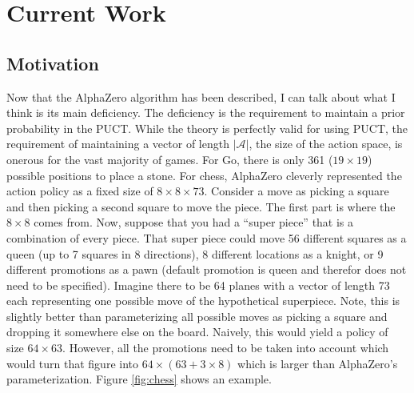 \documentclass{article}
\begin{document}
  \clearpage

  \section{Current Work}

  \subsection{Motivation}

  Now that the AlphaZero algorithm has been described, I can talk about what I think is its main deficiency. The deficiency is the requirement to maintain a prior probability in the PUCT. While the theory is perfectly valid for using PUCT, the requirement of maintaining a vector of length $\lvert \mathcal{A} \rvert$, the size of the action space, is onerous for the vast majority of games. For Go, there is only 361 ($19 \times 19$) possible positions to place a stone. For chess, AlphaZero cleverly represented the action policy as a fixed size of $8 \times 8 \times 73$. Consider a move as picking a square and then picking a second square to move the piece. The first part is where the $8 \times 8$ comes from. Now, suppose that you had a ``super piece'' that is a combination of every piece. That super piece could move 56 different squares as a queen (up to 7 squares in 8 directions), 8 different locations as a knight, or 9 different promotions as a pawn (default promotion is queen and therefor does not need to be specified). Imagine there to be 64 planes with a vector of length 73 each representing one possible move of the hypothetical superpiece. Note, this is slightly better than parameterizing all possible moves as picking a square and dropping it somewhere else on the board. Naively, this would yield a policy of size $64 \times 63$. However, all the promotions need to be taken into account which would turn that figure into $64 \times (63 + 3 \times 8)$ which is larger than AlphaZero's parameterization. Figure \ref{fig:chess} shows an example.
\end{document}
